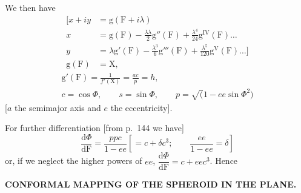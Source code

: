 We then have
\[
\begin{aligned}
\mathopen{[}x+iy&=\mathrm g(\mathrm F+i\lambda)\\
x&=\mathrm g(\mathrm F)-\frac{\lambda\lambda}{2}\mathrm g''(\mathrm F)
 +\frac{\lambda^4}{24}\mathrm g^{\mathrm{IV}}(\mathrm F)\ldots\\
y&=\lambda\mathrm g'(\mathrm F)-\frac{\lambda^3}{6}\mathrm g'''(\mathrm F)
 +\frac{\lambda^5}{120}\mathrm g^{\mathrm V}(\mathrm F)\ldots]\\
\mathrm g(\mathrm F)&=\mathrm X,
\end{aligned}
\]
\noindent [if \(\mathrm X\) now denotes the abscissa corresponding to the intersection of
the parallel \(\Phi\) with the principal meridian. Thus by Art.\ 1
\(f(\mathrm X)=\mathrm F(\Phi)\), so that
\(\dfrac{\mathrm d\mathrm X}{\mathrm d\mathrm F}=\dfrac1{f'(\mathrm X)}\). This gives]
\[
\begin{gathered}
\mathrm g'(\mathrm F)=\frac1{f'(\mathrm X)}=\frac{ac}{p}=h,\\
c=\cos\Phi,\qquad s=\sin\Phi,\qquad p=\surd(1-ee\sin\Phi^2)
\end{gathered}
\]
[\(a\) the semimajor axis and \(e\) the eccentricity].

For further differentiation [from p.\ 144 we have]
\[
\frac{\mathrm d\Phi}{\mathrm d\mathrm F}=\frac{ppc}{1-ee}
 \left[=c+\delta c^3;\qquad\frac{ee}{1-ee}=\delta\right]
\]
\noindent or, if we neglect the higher powers of \(ee\),
\(\dfrac{\mathrm d\Phi}{\mathrm d\mathrm F}=c+eec^3\). Hence

\par\clearpage
\noindent\null\hfill{\small\textbf{CONFORMAL MAPPING OF THE SPHEROID IN THE PLANE.}}\hfill{}\par\medskip


